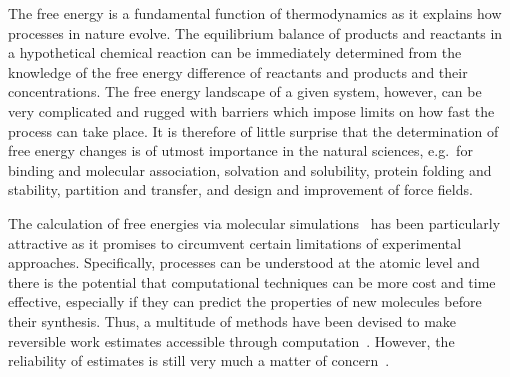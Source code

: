 \documentclass[journal=jctcce,manuscript=article]{achemso}
\begin{document}
The free energy is a fundamental function of thermodynamics as it explains
how processes in nature evolve.  The equilibrium balance of products and reactants in a hypothetical chemical reaction can be immediately determined
from the knowledge of the free energy difference of reactants and
products and their concentrations.  The free energy landscape of a given
system, however, can be very complicated and rugged with barriers which impose
limits on how fast the process can take place.  It is therefore of
little surprise that the determination of free energy changes is of
utmost importance in the natural sciences, e.g.\ for binding and
molecular association, solvation and solubility, protein folding and
stability, partition and transfer, and design and improvement of force
fields.

The calculation of free energies via molecular
simulations~\cite{hansen_practical_2014, doi:10.1021/jp102971x,
  Gallicchio201127, doi:10.1080/08927022.2015.1132317,
  doi:10.1146/annurev.matsci.32.111901.153708} has been particularly
attractive as it promises to circumvent certain limitations of experimental
approaches. Specifically, processes can be understood at the atomic level and there is the potential that computational techniques can be
more cost and time effective, especially if they can predict the properties of new molecules before their synthesis.
Thus, a multitude of methods have been devised
 to make reversible work estimates accessible through
computation~\cite{hansen_practical_2014,
  doi:10.1021/jp102971x, Gallicchio201127,
  doi:10.1080/08927022.2015.1132317,
  doi:10.1146/annurev.matsci.32.111901.153708}.  However, the
reliability of estimates is still very much a matter of
concern~\cite{doi:10.1021/jp102971x, doi:10.1021/acs.jctc.5b00179}.
\end{document}
